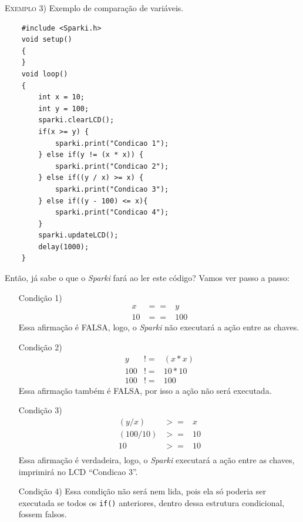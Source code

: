     \textsc{Exemplo 3)} Exemplo de comparação de variáveis.
    
    \begin{verbatim}
    #include <Sparki.h>
    void setup()
    {
    }
    void loop()
    {
        int x = 10;
        int y = 100;
        sparki.clearLCD();
        if(x >= y) {
            sparki.print("Condicao 1");
        } else if(y != (x * x)) {
            sparki.print("Condicao 2");
        } else if((y / x) >= x) {
            sparki.print("Condicao 3");
        } else if((y - 100) <= x){
            sparki.print("Condicao 4");
        }
        sparki.updateLCD();
        delay(1000);
    }
    \end{verbatim}
    
    Então, já sabe o que o \textsl{Sparki} fará ao ler este código? Vamos ver passo a passo:
    
    \begin{itemize}
        \item[Condição 1)]
        \begin{eqnarray}
        x & == & y\\
        10 & == & 100 \nonumber     \end{eqnarray}
        Essa afirmação é FALSA, logo, o \textsl{Sparki} não executará a ação entre as chaves.
        \item[Condição 2)]
        \begin{eqnarray}
        y & != & (x * x)\\
        100 & != & 10 * 10 \nonumber\\
        100 & != & 100 \nonumber
        \end{eqnarray}
        Essa afirmação também é FALSA, por isso a ação não será executada.
        \item[Condição 3)]
        \begin{eqnarray}
        (y / x) & >= & x\\
        (100 / 10) & >= & 10 \nonumber\\
        10 & >= & 10 \nonumber\\
        \end{eqnarray}
        Essa afirmação é verdadeira, logo, o \textsl{Sparki} executará a ação entre as chaves, imprimirá no LCD ``Condicao 3''.
        \item[Condição 4)]
        Essa condição não será nem lida, pois ela só poderia ser executada se todos os \texttt{if()} anteriores, dentro dessa estrutura condicional, fossem falsos.
    \end{itemize}
    
